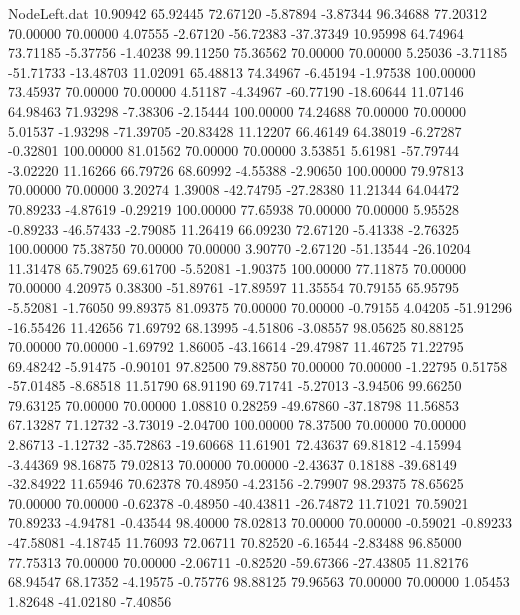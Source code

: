 \begin{filecontents}{NodeLeft.dat}
  10.90942   65.92445   72.67120    -5.87894   -3.87344   96.34688   77.20312   70.00000   70.00000    4.07555   -2.67120  -56.72383  -37.37349
  10.95998   64.74964   73.71185    -5.37756   -1.40238   99.11250   75.36562   70.00000   70.00000    5.25036   -3.71185  -51.71733  -13.48703
  11.02091   65.48813   74.34967    -6.45194   -1.97538  100.00000   73.45937   70.00000   70.00000    4.51187   -4.34967  -60.77190  -18.60644
  11.07146   64.98463   71.93298    -7.38306   -2.15444  100.00000   74.24688   70.00000   70.00000    5.01537   -1.93298  -71.39705  -20.83428
  11.12207   66.46149   64.38019    -6.27287   -0.32801  100.00000   81.01562   70.00000   70.00000    3.53851    5.61981  -57.79744   -3.02220
  11.16266   66.79726   68.60992    -4.55388   -2.90650  100.00000   79.97813   70.00000   70.00000    3.20274    1.39008  -42.74795  -27.28380
  11.21344   64.04472   70.89233    -4.87619   -0.29219  100.00000   77.65938   70.00000   70.00000    5.95528   -0.89233  -46.57433   -2.79085
  11.26419   66.09230   72.67120    -5.41338   -2.76325  100.00000   75.38750   70.00000   70.00000    3.90770   -2.67120  -51.13544  -26.10204
  11.31478   65.79025   69.61700    -5.52081   -1.90375  100.00000   77.11875   70.00000   70.00000    4.20975    0.38300  -51.89761  -17.89597
  11.35554   70.79155   65.95795    -5.52081   -1.76050   99.89375   81.09375   70.00000   70.00000   -0.79155    4.04205  -51.91296  -16.55426
  11.42656   71.69792   68.13995    -4.51806   -3.08557   98.05625   80.88125   70.00000   70.00000   -1.69792    1.86005  -43.16614  -29.47987
  11.46725   71.22795   69.48242    -5.91475   -0.90101   97.82500   79.88750   70.00000   70.00000   -1.22795    0.51758  -57.01485   -8.68518
  11.51790   68.91190   69.71741    -5.27013   -3.94506   99.66250   79.63125   70.00000   70.00000    1.08810    0.28259  -49.67860  -37.18798
  11.56853   67.13287   71.12732    -3.73019   -2.04700  100.00000   78.37500   70.00000   70.00000    2.86713   -1.12732  -35.72863  -19.60668
  11.61901   72.43637   69.81812    -4.15994   -3.44369   98.16875   79.02813   70.00000   70.00000   -2.43637    0.18188  -39.68149  -32.84922
  11.65946   70.62378   70.48950    -4.23156   -2.79907   98.29375   78.65625   70.00000   70.00000   -0.62378   -0.48950  -40.43811  -26.74872
  11.71021   70.59021   70.89233    -4.94781   -0.43544   98.40000   78.02813   70.00000   70.00000   -0.59021   -0.89233  -47.58081   -4.18745
  11.76093   72.06711   70.82520    -6.16544   -2.83488   96.85000   77.75313   70.00000   70.00000   -2.06711   -0.82520  -59.67366  -27.43805
  11.82176   68.94547   68.17352    -4.19575   -0.75776   98.88125   79.96563   70.00000   70.00000    1.05453    1.82648  -41.02180   -7.40856

\end{filecontents}
